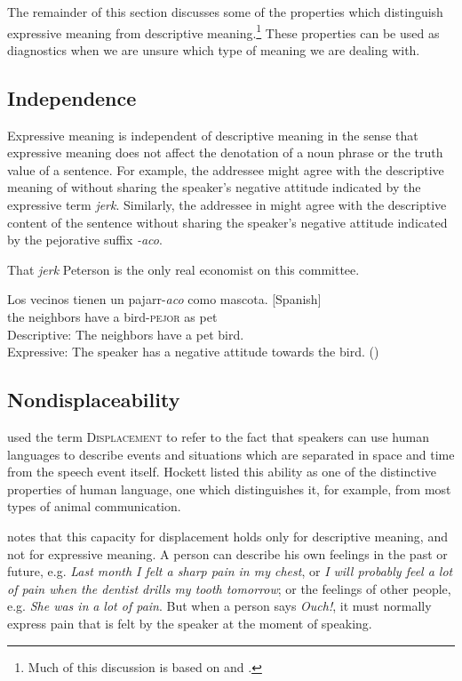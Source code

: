 The remainder of this section discusses some of the properties which distinguish expressive meaning from descriptive meaning.\footnote{Much of this discussion is based on \citet{Cruse1986,Cruse2000} and \citet{Potts2007c}.} These properties can be used as diagnostics when we are unsure which type of meaning we are dealing with.


\subsection{Independence}\label{sec:} %

Expressive meaning is independent of descriptive meaning in the sense that expressive meaning does not affect the denotation of a noun phrase or the truth value of a sentence. For example, the addressee might agree with the descriptive meaning of  without sharing the speaker’s negative attitude indicated by the expressive term \textit{jerk}. Similarly, the addressee in  might agree with the descriptive content of the sentence without sharing the speaker’s negative attitude indicated by the pejorative suffix \textit{-aco}.


\ea \label{ex:2.15}
That \textit{jerk} Peterson is the only real economist on this committee.
\z

\ea \label{ex:2.16}
\gll Los  vecinos  tienen  un  pajarr-\textit{aco}  como  mascota.  [Spanish]\\
the  neighbors  have  a  bird-\textsc{pejor}  as  pet\\
\glt Descriptive: The neighbors have a pet bird.\\
Expressive: The speaker has a negative attitude towards the bird.  (\citealt{Fortin2011})
\z

\subsection{Nondisplaceability}\label{sec:} %

\citet{Hockett1958,Hockett1960} used the term \textsc{Displacement} to refer to the fact that speakers can use human languages to describe events and situations which are separated in space and time from the speech event itself. Hockett listed this ability as one of the distinctive properties of human language, one which distinguishes it, for example, from most types of animal communication.



\citet[272]{Cruse1986} notes that this capacity for displacement holds only for descriptive meaning, and not for expressive meaning. A person can describe his own feelings in the past or future, e.g. \textit{Last month I felt a sharp pain in my chest}, or \textit{I will probably feel a lot of pain when the dentist drills my tooth tomorrow}; or the feelings of other people, e.g. \textit{She was in} \textit{a lot of pain}. But when a person says \textit{Ouch!}, it must normally express pain that is felt by the speaker at the moment of speaking.


